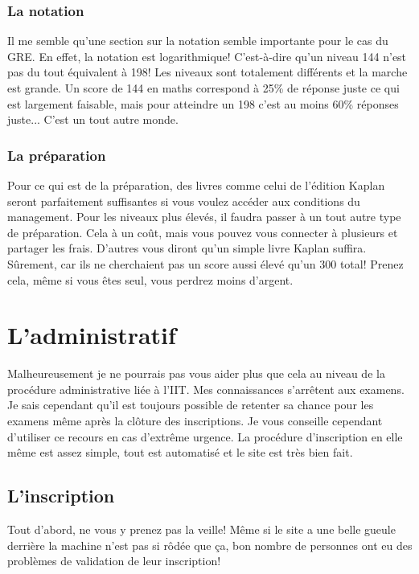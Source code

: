 \subsubsection{La notation}\label{sec:sec2.2.2.2}
Il me semble qu’une section sur la notation semble importante pour le cas du GRE. En effet, la notation est logarithmique! C’est-à-dire qu’un niveau 144 n’est pas du tout équivalent à 198! Les niveaux sont totalement différents et la marche est grande. Un score de 144 en maths correspond à 25\% de réponse juste ce qui est largement faisable, mais pour atteindre un 198 c’est au moins 60\% réponses juste... C’est un tout autre monde.

\subsubsection{La préparation}\label{sec:sec2.2.2.3}
Pour ce qui est de la préparation, des livres comme celui de l’édition Kaplan seront parfaitement suffisantes si vous voulez accéder aux conditions du management. Pour les niveaux plus élevés, il faudra passer à un tout autre type de préparation. Cela à un coût, mais vous pouvez vous connecter à plusieurs et partager les frais.
D’autres vous diront qu’un simple livre Kaplan suffira. Sûrement, car ils ne cherchaient pas un score aussi élevé qu’un 300 total! Prenez cela, même si vous êtes seul, vous perdrez moins d’argent.


\section{L’administratif}\label{sec:sec2.3}
Malheureusement je ne pourrais pas vous aider plus que cela au niveau de la procédure administrative liée à l’IIT. Mes connaissances s’arrêtent aux examens. Je sais cependant qu’il est toujours possible de retenter sa chance pour les examens même après la clôture des inscriptions. Je vous conseille cependant d’utiliser ce recours en cas d’extrême urgence. La procédure d’inscription en elle même est assez simple, tout est automatisé et le site est très bien fait.

\subsection{L’inscription}\label{sec:sec2.3.1}
Tout d’abord, ne vous y prenez pas la veille! Même si le site a une belle gueule derrière la machine n’est pas si rôdée que ça, bon nombre de personnes ont eu des problèmes de validation de leur inscription!

